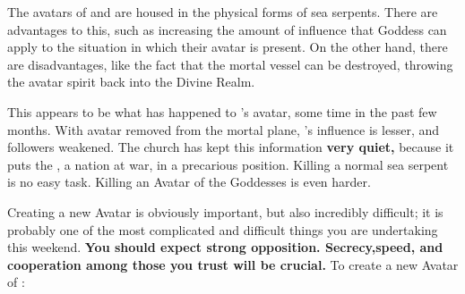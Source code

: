 \documentclass[green]{GL2020}
\begin{document}
\name{\gEbbAvatar{}}

The avatars of \cEbb{} and \cFlow{} are housed in the physical forms of sea serpents. There are advantages to this, such as increasing the amount of influence that Goddess can apply to the situation in which their avatar is present. On the other hand, there are disadvantages, like the fact that the mortal vessel can be destroyed, throwing the avatar spirit back into the Divine Realm. 

This appears to be what has happened to \cEbb{}’s avatar, some time in the past few months. With \cEbb{\their} avatar removed from the mortal plane, \cEbb{}’s influence is lesser, and \cEbb{\their} followers weakened. The church has kept this information \textbf{very quiet,} because it puts the \pShip{}, a nation at war, in a precarious position. Killing a normal sea serpent is no easy task. Killing an Avatar of the Goddesses is even harder.

Creating a new Avatar is obviously important, but also incredibly difficult; it is probably one of the most complicated and difficult things you are undertaking this weekend. \textbf{You should expect strong opposition. Secrecy,speed, and cooperation among those you trust will be crucial.} To create a new Avatar of \cEbb{}:
\end{document}
